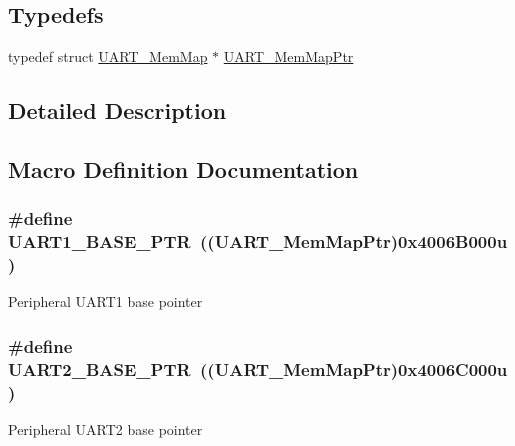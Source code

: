 \subsection*{Typedefs}
\begin{DoxyCompactItemize}
\item 
typedef struct \hyperlink{struct_u_a_r_t___mem_map}{U\+A\+R\+T\+\_\+\+Mem\+Map} $\ast$ \hyperlink{group___u_a_r_t___peripheral_ga306cf44b593fadbb29a065f42e3f68f0}{U\+A\+R\+T\+\_\+\+Mem\+Map\+Ptr}
\end{DoxyCompactItemize}


\subsection{Detailed Description}


\subsection{Macro Definition Documentation}
\hypertarget{group___u_a_r_t___peripheral_gafb5b1236c1cdf2d9a6464251b791030c}{}
\subsubsection[{U\+A\+R\+T1\+\_\+\+B\+A\+S\+E\+\_\+\+P\+T\+R}]{\setlength{\rightskip}{0pt plus 5cm}\#define U\+A\+R\+T1\+\_\+\+B\+A\+S\+E\+\_\+\+P\+T\+R~(({\bf U\+A\+R\+T\+\_\+\+Mem\+Map\+Ptr})0x4006\+B000u)}\label{group___u_a_r_t___peripheral_gafb5b1236c1cdf2d9a6464251b791030c}
Peripheral U\+A\+R\+T1 base pointer \hypertarget{group___u_a_r_t___peripheral_ga75ca2ea4e490b3c1c7aa55fc9c25cd37}{}
\subsubsection[{U\+A\+R\+T2\+\_\+\+B\+A\+S\+E\+\_\+\+P\+T\+R}]{\setlength{\rightskip}{0pt plus 5cm}\#define U\+A\+R\+T2\+\_\+\+B\+A\+S\+E\+\_\+\+P\+T\+R~(({\bf U\+A\+R\+T\+\_\+\+Mem\+Map\+Ptr})0x4006\+C000u)}\label{group___u_a_r_t___peripheral_ga75ca2ea4e490b3c1c7aa55fc9c25cd37}
Peripheral U\+A\+R\+T2 base pointer \hypertarget{group___u_a_r_t___peripheral_ga7b34a38b9492a1e1007b2f66383aef17}{}
